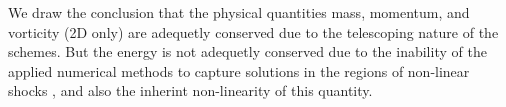 We draw the conclusion that the physical quantities mass, momentum, and vorticity (2D only) are adequetly conserved due to the telescoping nature of the schemes.
But the energy is not adequetly conserved due to the inability of the applied numerical methods to capture solutions in the regions of non-linear shocks \cite{Lax}, and also the 
inherint non-linearity of this quantity. 
